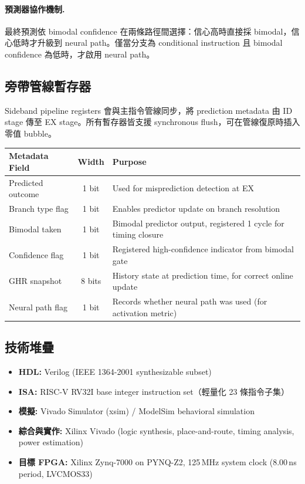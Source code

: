 \documentclass[12pt,a4paper]{article}
\begin{document}
	\paragraph{預測器協作機制.}
	最終預測依 bimodal confidence 在兩條路徑間選擇：信心高時直接採 bimodal，信心低時才升級到 neural path。僅當分支為 conditional instruction 且 bimodal confidence 為低時，才啟用 neural path。

	\subsection{旁帶管線暫存器}
	\label{sec:sideband}

	Sideband pipeline registers 會與主指令管線同步，將 prediction metadata 由 ID stage 傳至 EX stage。所有暫存器皆支援 synchronous flush，可在管線復原時插入零值 bubble。

	\begin{center}
		\renewcommand{\arraystretch}{1.3}
		\begin{tabularx}{\linewidth}{p{3.0cm}cX}
			\toprule
			\textbf{Metadata Field} & \textbf{Width} & \textbf{Purpose}                                                \\
			\midrule
			Predicted outcome       & 1 bit          & Used for misprediction detection at EX                          \\
			Branch type flag        & 1 bit          & Enables predictor update on branch resolution                   \\
			Bimodal taken           & 1 bit          & Bimodal predictor output, registered 1 cycle for timing closure \\
			Confidence flag         & 1 bit          & Registered high-confidence indicator from bimodal gate          \\
			GHR snapshot            & 8 bits         & History state at prediction time, for correct online update     \\
			Neural path flag        & 1 bit          & Records whether neural path was used (for activation metric)    \\
			\bottomrule
		\end{tabularx}
	\end{center}

	\subsection{技術堆疊}
	\label{sec:techstack}

	\begin{itemize}
		\item \textbf{HDL:} Verilog (IEEE 1364-2001 synthesizable subset)
		\item \textbf{ISA:} RISC-V RV32I base integer instruction set（輕量化 23 條指令子集）
		\item \textbf{模擬:} Vivado Simulator (xsim) / ModelSim behavioral simulation
		\item \textbf{綜合與實作:} Xilinx Vivado (logic synthesis,
		      place-and-route, timing analysis, power estimation)
		\item \textbf{目標 FPGA:} Xilinx Zynq-7000 on PYNQ-Z2, 125\,MHz system clock
		      (8.00\,ns period, LVCMOS33)
	\end{itemize}
\end{document}
